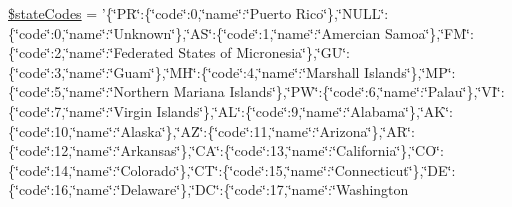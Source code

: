 \begin{DoxyCompactItemize}
\hyperlink{class_fifth_gear_af228142fd30b1c6684cdf8551c23c679}{\$state\-Codes} = '\{\char`\"{}P\-R\char`\"{}\-:\{\char`\"{}code\char`\"{}\-:0,\char`\"{}name\char`\"{}\-:\char`\"{}Puerto Rico\char`\"{}\},\char`\"{}N\-U\-L\-L\char`\"{}\-:\{\char`\"{}code\char`\"{}\-:0,\char`\"{}name\char`\"{}\-:\char`\"{}Unknown\char`\"{}\},\char`\"{}A\-S\char`\"{}\-:\{\char`\"{}code\char`\"{}\-:1,\char`\"{}name\char`\"{}\-:\char`\"{}Amercian Samoa\char`\"{}\},\char`\"{}F\-M\char`\"{}\-:\{\char`\"{}code\char`\"{}\-:2,\char`\"{}name\char`\"{}\-:\char`\"{}Federated States of Micronesia\char`\"{}\},\char`\"{}G\-U\char`\"{}\-:\{\char`\"{}code\char`\"{}\-:3,\char`\"{}name\char`\"{}\-:\char`\"{}Guam\char`\"{}\},\char`\"{}M\-H\char`\"{}\-:\{\char`\"{}code\char`\"{}\-:4,\char`\"{}name\char`\"{}\-:\char`\"{}Marshall Islands\char`\"{}\},\char`\"{}M\-P\char`\"{}\-:\{\char`\"{}code\char`\"{}\-:5,\char`\"{}name\char`\"{}\-:\char`\"{}Northern Mariana Islands\char`\"{}\},\char`\"{}P\-W\char`\"{}\-:\{\char`\"{}code\char`\"{}\-:6,\char`\"{}name\char`\"{}\-:\char`\"{}Palau\char`\"{}\},\char`\"{}V\-I\char`\"{}\-:\{\char`\"{}code\char`\"{}\-:7,\char`\"{}name\char`\"{}\-:\char`\"{}Virgin Islands\char`\"{}\},\char`\"{}A\-L\char`\"{}\-:\{\char`\"{}code\char`\"{}\-:9,\char`\"{}name\char`\"{}\-:\char`\"{}Alabama\char`\"{}\},\char`\"{}A\-K\char`\"{}\-:\{\char`\"{}code\char`\"{}\-:10,\char`\"{}name\char`\"{}\-:\char`\"{}Alaska\char`\"{}\},\char`\"{}A\-Z\char`\"{}\-:\{\char`\"{}code\char`\"{}\-:11,\char`\"{}name\char`\"{}\-:\char`\"{}Arizona\char`\"{}\},\char`\"{}A\-R\char`\"{}\-:\{\char`\"{}code\char`\"{}\-:12,\char`\"{}name\char`\"{}\-:\char`\"{}Arkansas\char`\"{}\},\char`\"{}C\-A\char`\"{}\-:\{\char`\"{}code\char`\"{}\-:13,\char`\"{}name\char`\"{}\-:\char`\"{}California\char`\"{}\},\char`\"{}C\-O\char`\"{}\-:\{\char`\"{}code\char`\"{}\-:14,\char`\"{}name\char`\"{}\-:\char`\"{}Colorado\char`\"{}\},\char`\"{}C\-T\char`\"{}\-:\{\char`\"{}code\char`\"{}\-:15,\char`\"{}name\char`\"{}\-:\char`\"{}Connecticut\char`\"{}\},\char`\"{}D\-E\char`\"{}\-:\{\char`\"{}code\char`\"{}\-:16,\char`\"{}name\char`\"{}\-:\char`\"{}Delaware\char`\"{}\},\char`\"{}D\-C\char`\"{}\-:\{\char`\"{}code\char`\"{}\-:17,\char`\"{}name\char`\"{}\-:\char`\"{}Washington 
\end{DoxyCompactItemize}
